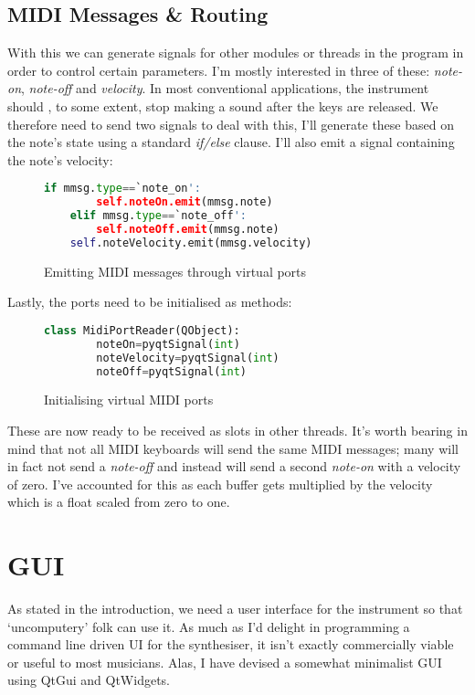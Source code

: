 \documentclass{article}
\begin{document}
\pagebreak
\subsection{MIDI Messages \& Routing}
With this we can generate signals for other modules or threads in the program in order to control certain parameters. I'm mostly interested in three of these: \textit{note-on}, \textit{note-off} and \textit{velocity}. In most conventional applications, the instrument should , to some extent, stop making a sound after the keys are released. We therefore need to send two signals to deal with this, I'll generate these based on the note's state using a standard \textit{if/else} clause. I'll also emit a signal containing the note's velocity:

 \begin{figure}[H]
	\begin{lstlisting}[language=python]
	if mmsg.type==`note_on':
		self.noteOn.emit(mmsg.note)
	elif mmsg.type==`note_off':
		self.noteOff.emit(mmsg.note)
	self.noteVelocity.emit(mmsg.velocity) 
	\end{lstlisting}
	\caption{Emitting MIDI messages through virtual ports}
\end{figure}

Lastly, the ports need to be initialised as methods:
 \begin{figure}[H]
	\begin{lstlisting}[language=python]
	class MidiPortReader(QObject):
		noteOn=pyqtSignal(int)
		noteVelocity=pyqtSignal(int)
		noteOff=pyqtSignal(int) 
	\end{lstlisting}
	\caption{Initialising virtual MIDI ports}
\end{figure}
These are now ready to be received as slots in other threads. It's worth bearing in mind that not all MIDI keyboards will send the same MIDI messages; many will in fact not send a \textit{note-off} and instead will send a second \textit{note-on} with a velocity of zero. I've accounted for this as each buffer gets multiplied by the velocity which is a float scaled from zero to one. 

\pagebreak
\section{GUI}
As stated in the introduction, we need a user interface for the instrument so that `uncomputery' folk can use it. As much as I'd delight in programming a command line driven UI for the synthesiser, it isn't exactly commercially viable or useful to most musicians. Alas, I have devised a somewhat minimalist GUI using QtGui and QtWidgets.
\end{document}
